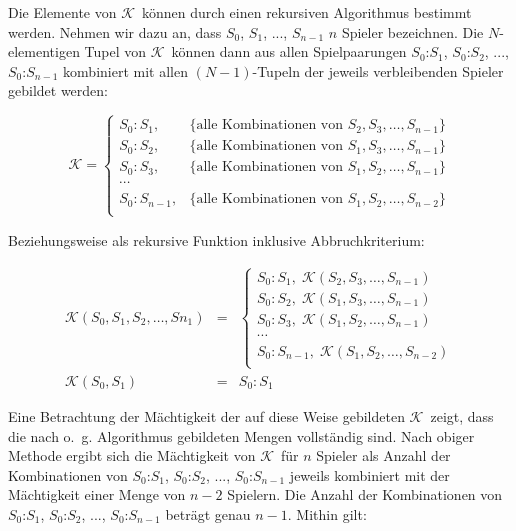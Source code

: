 \documentclass[DIV=15, 10pt]{scrartcl}
\newcommand{\KSet}{$\mathcal{K}$}
\begin{document}
Die Elemente von \KSet\ können durch einen rekursiven Algorithmus bestimmt werden. Nehmen wir dazu an, dass $S_0$, $S_1$, ..., $S_{n-1}$ $n$ Spieler bezeichnen. Die $N$-elementigen Tupel von \KSet\ können dann aus allen Spielpaarungen $S_0$:$S_1$, $S_0$:$S_2$, ..., $S_0$:$S_{n-1}$ kombiniert mit allen $(N-1)$-Tupeln der jeweils verbleibenden Spieler gebildet werden:

\[
\mathcal{K} = \left\lbrace
\begin{array}{ll}
S_0:S_1, & \{\text{alle Kombinationen von }S_2, S_3, \ldots, S_{n-1}\}\\
S_0:S_2, & \{\text{alle Kombinationen von }S_1, S_3, \ldots, S_{n-1}\}\\
S_0:S_3, & \{\text{alle Kombinationen von }S_1, S_2, \ldots, S_{n-1}\}\\
\cdots\\
S_0:S_{n-1}, & \{\text{alle Kombinationen von }S_1, S_2, \ldots, S_{n-2}\}\\
\end{array}
\right.
\]

Beziehungsweise als rekursive Funktion inklusive Abbruchkriterium:

\begin{equation}\label{AlgoK}
\begin{array}{rcl}
\mathcal{K}(S_0, S_1, S_2, \ldots, S{n_1}) & = & \left\lbrace
\begin{array}{ll}
S_0:S_1, \; \mathcal{K}(S_2, S_3, \ldots, S_{n-1})\\
S_0:S_2, \; \mathcal{K}(S_1, S_3, \ldots, S_{n-1})\\
S_0:S_3, \; \mathcal{K}(S_1, S_2, \ldots, S_{n-1})\\
\cdots\\
S_0:S_{n-1}, \; \mathcal{K}(S_1, S_2, \ldots, S_{n-2})\\
\end{array}\right.\\[12mm]
\mathcal{K}(S_0, S_1) & = & S_0 : S_1
\end{array}
\end{equation}

Eine Betrachtung der Mächtigkeit der auf diese Weise gebildeten \KSet\ zeigt, dass die nach o.~g. Algorithmus gebildeten Mengen vollständig sind. Nach obiger Methode ergibt sich die Mächtigkeit von \KSet\ für $n$ Spieler als Anzahl der Kombinationen von $S_0$:$S_1$, $S_0$:$S_2$, ..., $S_0$:$S_{n-1}$ jeweils kombiniert mit der Mächtigkeit einer Menge von $n-2$ Spielern. Die Anzahl der Kombinationen von $S_0$:$S_1$, $S_0$:$S_2$, ..., $S_0$:$S_{n-1}$ beträgt genau $n-1$. Mithin gilt:
\end{document}
